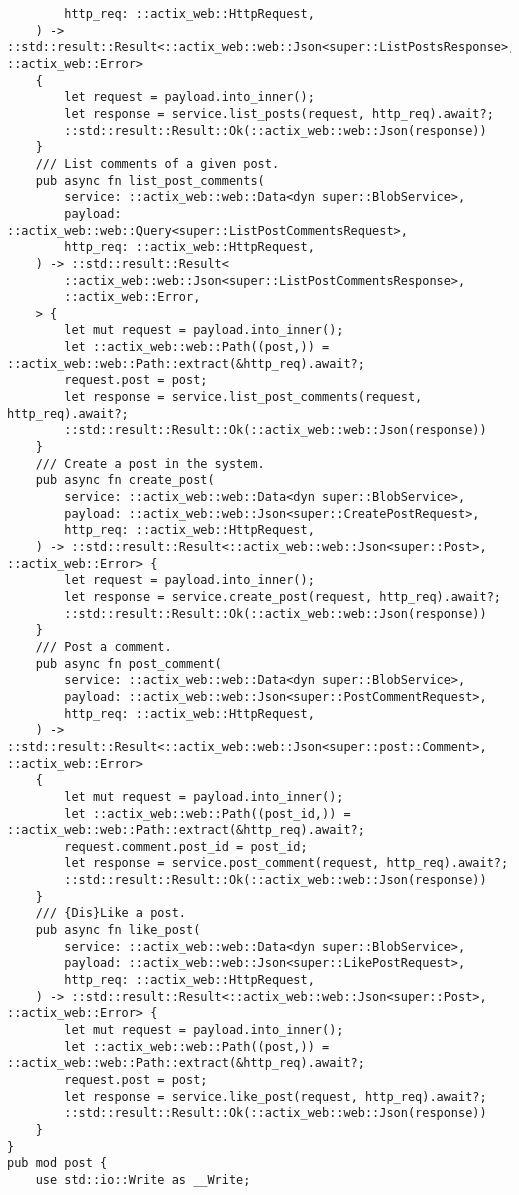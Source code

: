 \begin{verbatim}
        http_req: ::actix_web::HttpRequest,
    ) -> ::std::result::Result<::actix_web::web::Json<super::ListPostsResponse>, ::actix_web::Error>
    {
        let request = payload.into_inner();
        let response = service.list_posts(request, http_req).await?;
        ::std::result::Result::Ok(::actix_web::web::Json(response))
    }
    /// List comments of a given post.
    pub async fn list_post_comments(
        service: ::actix_web::web::Data<dyn super::BlobService>,
        payload: ::actix_web::web::Query<super::ListPostCommentsRequest>,
        http_req: ::actix_web::HttpRequest,
    ) -> ::std::result::Result<
        ::actix_web::web::Json<super::ListPostCommentsResponse>,
        ::actix_web::Error,
    > {
        let mut request = payload.into_inner();
        let ::actix_web::web::Path((post,)) = ::actix_web::web::Path::extract(&http_req).await?;
        request.post = post;
        let response = service.list_post_comments(request, http_req).await?;
        ::std::result::Result::Ok(::actix_web::web::Json(response))
    }
    /// Create a post in the system.
    pub async fn create_post(
        service: ::actix_web::web::Data<dyn super::BlobService>,
        payload: ::actix_web::web::Json<super::CreatePostRequest>,
        http_req: ::actix_web::HttpRequest,
    ) -> ::std::result::Result<::actix_web::web::Json<super::Post>, ::actix_web::Error> {
        let request = payload.into_inner();
        let response = service.create_post(request, http_req).await?;
        ::std::result::Result::Ok(::actix_web::web::Json(response))
    }
    /// Post a comment.
    pub async fn post_comment(
        service: ::actix_web::web::Data<dyn super::BlobService>,
        payload: ::actix_web::web::Json<super::PostCommentRequest>,
        http_req: ::actix_web::HttpRequest,
    ) -> ::std::result::Result<::actix_web::web::Json<super::post::Comment>, ::actix_web::Error>
    {
        let mut request = payload.into_inner();
        let ::actix_web::web::Path((post_id,)) = ::actix_web::web::Path::extract(&http_req).await?;
        request.comment.post_id = post_id;
        let response = service.post_comment(request, http_req).await?;
        ::std::result::Result::Ok(::actix_web::web::Json(response))
    }
    /// {Dis}Like a post.
    pub async fn like_post(
        service: ::actix_web::web::Data<dyn super::BlobService>,
        payload: ::actix_web::web::Json<super::LikePostRequest>,
        http_req: ::actix_web::HttpRequest,
    ) -> ::std::result::Result<::actix_web::web::Json<super::Post>, ::actix_web::Error> {
        let mut request = payload.into_inner();
        let ::actix_web::web::Path((post,)) = ::actix_web::web::Path::extract(&http_req).await?;
        request.post = post;
        let response = service.like_post(request, http_req).await?;
        ::std::result::Result::Ok(::actix_web::web::Json(response))
    }
}
pub mod post {
    use std::io::Write as __Write;


\end{verbatim}
